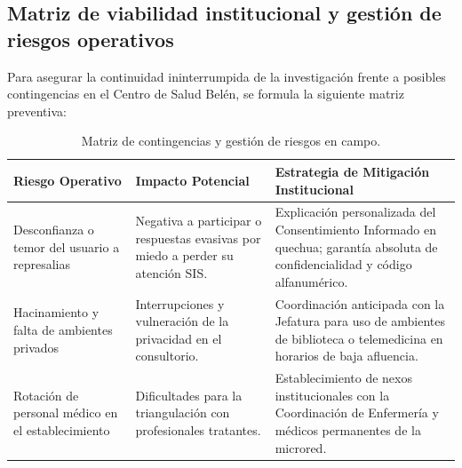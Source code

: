 \subsection{Matriz de viabilidad institucional y gestión de riesgos operativos}
\label{sec:5.5_riesgos}
Para asegurar la continuidad ininterrumpida de la investigación frente a posibles contingencias en el Centro de Salud Belén, se formula la siguiente matriz preventiva:

\begin{table}[H]
\centering
\small
\begin{tabularx}{\textwidth}{p{3.2cm}Xp{5.5cm}}
\toprule
\textbf{Riesgo Operativo} & \textbf{Impacto Potencial} & \textbf{Estrategia de Mitigación Institucional} \\
\midrule
Desconfianza o temor del usuario a represalias & Negativa a participar o respuestas evasivas por miedo a perder su atención SIS. & Explicación personalizada del Consentimiento Informado en quechua; garantía absoluta de confidencialidad y código alfanumérico. \\
\addlinespace
Hacinamiento y falta de ambientes privados & Interrupciones y vulneración de la privacidad en el consultorio. & Coordinación anticipada con la Jefatura para uso de ambientes de biblioteca o telemedicina en horarios de baja afluencia. \\
\addlinespace
Rotación de personal médico en el establecimiento & Dificultades para la triangulación con profesionales tratantes. & Establecimiento de nexos institucionales con la Coordinación de Enfermería y médicos permanentes de la microred. \\
\bottomrule
\end{tabularx}
\caption{Matriz de contingencias y gestión de riesgos en campo.}
\label{tab:riesgos_operativos}
\end{table}

\newpage
